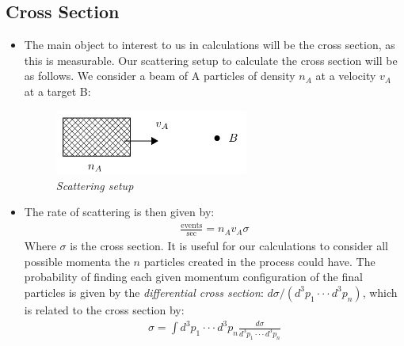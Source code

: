 \documentclass[11pt]{article}
\numberwithin{equation}{section}
\begin{document}
 \subsection{Cross Section} %
 \label{sub:cross_section}
 \begin{itemize}
     \item The main object to interest to us in calculations will be the cross section, as this is measurable. Our scattering setup to calculate the cross section will be as follows. We consider a beam of A particles of density $n_A$ at a velocity $v_A$ at a target B:
\begin{figure}[H]
\centering
\includegraphics[width=0.6\textwidth]{scatter}
\caption{\label{trailer}\emph{Scattering setup}}
\end{figure}
\item The rate of scattering is then given by:
\begin{align*}
    \frac{\text{events}}{\text{sec}} = n_Av_A\sigma
\end{align*}
Where $\sigma$ is the cross section. It is useful for our calculations to consider all possible momenta the $n$ particles created in the process could have. The probability of finding each given momentum configuration of the final particles is given by the \emph{differential cross section}: $d\sigma/(d^3p_1 \cdot \cdot \cdot d^3p_n)$, which is related to the cross section by:
\begin{align*}
    \sigma = \int d^3p_1 \cdot \cdot \cdot d^3p_n\frac{d\sigma}{d^3p_1 \cdot \cdot \cdot d^3p_n}
\end{align*}

 \end{itemize}
\end{document}

